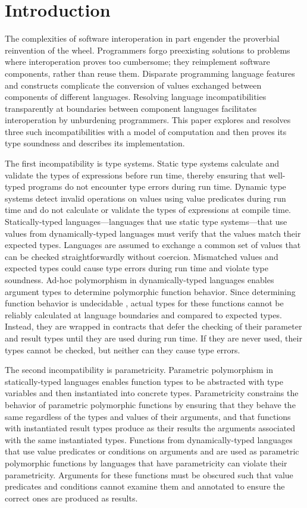 \chapter{Introduction}

The complexities of software interoperation in part engender the proverbial reinvention of the wheel.  Programmers forgo preexisting solutions to problems where interoperation proves too cumbersome; they reimplement software components, rather than reuse them.  Disparate programming language features and constructs complicate the conversion of values exchanged between components of different languages.  Resolving language incompatibilities transparently at boundaries between component languages facilitates interoperation by unburdening programmers.  This paper explores and resolves three such incompatibilities with a model of computation and then proves its type soundness and describes its implementation.

The first incompatibility is type systems.  Static type systems calculate and validate the types of expressions before run time, thereby ensuring that well-typed programs do not encounter type errors during run time.  Dynamic type systems detect invalid operations on values using value predicates during run time and do not calculate or validate the types of expressions at compile time.  Statically-typed languages---languages that use static type systems---that use values from dynamically-typed languages must verify that the values match their expected types.  Languages are assumed to exchange a common set of values that can be checked straightforwardly without coercion.  Mismatched values and expected types could cause type errors during run time and violate type soundness.  Ad-hoc polymorphism in dynamically-typed languages enables argument types to determine polymorphic function behavior.  Since determining function behavior is undecidable \cite{blume04}, actual types for these functions cannot be reliably calculated at language boundaries and compared to expected types.  Instead, they are wrapped in contracts \cite{findler02} that defer the checking of their parameter and result types until they are used during run time.  If they are never used, their types cannot be checked, but neither can they cause type errors.

The second incompatibility is parametricity.  Parametric polymorphism in statically-typed languages enables function types to be abstracted with type variables and then instantiated into concrete types.  Parametricity constrains the behavior of parametric polymorphic functions by ensuring that they behave the same regardless of the types and values of their arguments, and that functions with instantiated result types produce as their results the arguments associated with the same instantiated types.  Functions from dynamically-typed languages that use value predicates or conditions on arguments and are used as parametric polymorphic functions by languages that have parametricity can violate their parametricity.  Arguments for these functions must be obscured such that value predicates and conditions cannot examine them and annotated to ensure the correct ones are produced as results.


